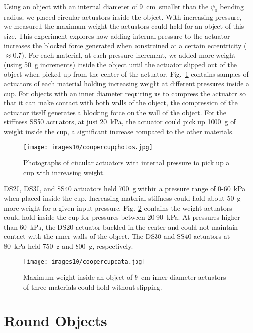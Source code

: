 Using an object with an internal diameter of 9~cm, smaller than the $\psi_0$ bending radius, we placed circular actuators inside the object. With increasing pressure, we measured the maximum weight the actuators could hold for an object of this size. This experiment explores how adding internal pressure to the actuator increases the blocked force generated when constrained at a certain eccentricity ( $\approx0.7$). For each material, at each pressure increment, we added more weight (using 50~g increments) inside the object until the actuator slipped out of the object when picked up from the center of the actuator. Fig.~\ref{fig:coopercupphotos} contains samples of actuators of each material holding increasing weight at different pressures inside a cup. For objects with an inner diameter requiring us to compress the actuator so that it can make contact with both walls of the object, the compression of the actuator itself generates a blocking force on the wall of the object. For the stiffness SS50 actuators, at just 20~kPa, the actuator could pick up 1000~g of weight inside the cup, a significant increase compared to the other materials. 
\\
\begin{figure}[!ht]
    \centering
     \texttt{[image: images10/coopercupphotos.jpg]}
    \caption{Photographs of circular actuators with internal pressure to pick up a cup with increasing weight.}
    \label{fig:coopercupphotos}
\end{figure}

DS20, DS30, and SS40 actuators held 700~g within a pressure range of 0-60~kPa when placed inside the cup. Increasing material stiffness could hold about 50~g more weight for a given input pressure. Fig.~\ref{fig:coopercupdata} contains the weight actuators could hold inside the cup for pressures between 20-90~kPa. At pressures higher than 60~kPa, the DS20 actuator buckled in the center and could not maintain contact with the inner walls of the object. The DS30 and SS40 actuators at 80~kPa held 750~g and 800~g, respectively. \\ 

\begin{figure}[!ht]
    \centering
     \texttt{[image: images10/coopercupdata.jpg]}
    \caption{Maximum weight inside an object of 9~cm inner diameter actuators of three materials could hold without slipping.}
    \label{fig:coopercupdata}
\end{figure}

\clearpage
\section{Round Objects}

